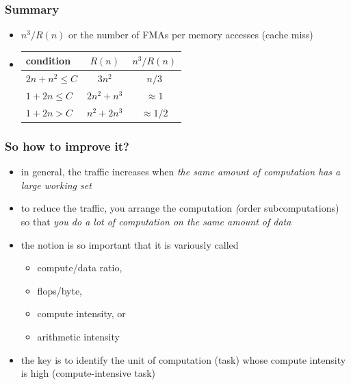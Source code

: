 \documentclass[12pt,dvipdfmx]{beamer}
\newcommand{\ao}[1]{{\color{blue}#1}}
\begin{document}
\begin{frame}
\frametitle{Summary}
\begin{itemize}
\item $n^3 / R(n)$ or the number of FMAs per memory accesses (cache miss)
\item []
\begin{center}
\begin{tabular}{|l|c|c|}\hline
condition         & $R(n)$       & $n^3/R(n)$ \\\hline
$2n + n^2 \leq C$ & $3n^2$       & $n/3$ \\
$1 + 2n \leq C$   & $2n^2 + n^3$ & $\approx 1$ \\ 
$1 + 2n > C$      & $n^2 + 2n^3$ & $\approx 1/2$ \\\hline
\end{tabular}
\end{center}
\end{itemize}
\end{frame}


\begin{frame}
\frametitle{So how to improve it?}
\begin{itemize}
\item<1-> in general, the traffic increases when 
  \ao{\emph{the same amount of computation has a large working set}}
\item<2-> to reduce the traffic, you arrange the computation
  \ao{\emph (order subcomputations)} so that
  \ao{\emph{you do a lot of computation on the same amount of data}}
\item<3-> the notion is so important that it is variously called
  \begin{itemize}
  \item \ao{compute/data ratio,}
  \item \ao{flops/byte,} 
  \item \ao{compute intensity,} or
  \item \ao{arithmetic intensity}
  \end{itemize}
\item<4-> the key is to identify the unit of computation (task) 
  whose compute intensity is high \ao{(compute-intensive task)}
\end{itemize}
\end{frame}


\end{document}
